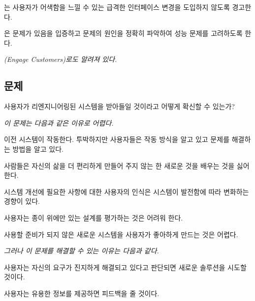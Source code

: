 \documentclass[a4paper,10pt,twoside]{book}
\begin{document}
\begin{bulletlist}
\item  {}는 사용자가 어색함을 느낄 수 있는 급격한 인터페이스 변경을 도입하지 않도록 경고한다.

\item {}은 문제가 있음을 입증하고 문제의 원인을 정확히 파악하여 성능 문제를 고려하도록 한다.
\end{bulletlist}


\emph{(Engage Customers)로도 알려져 있다.} \cite{Copl95d}


\subsection*{문제}

사용자가 리엔지니어링된 시스템을 받아들일 것이라고 어떻게 확신할 수 있는가?

\emph{이 문제는 다음과 같은 이유로 어렵다.}

\begin{bulletlist}
\item 이전 시스템이 작동한다. 투박하지만 사용자들은 작동 방식을 알고 있고 문제를 해결하는 방법을 알고 있다.

\item 사람들은 자신의 삶을 더 편리하게 만들어 주지 않는 한 새로운 것을 배우는 것을 싫어한다.

\item 시스템 개선에 필요한 사항에 대한 사용자의 인식은 시스템이 발전함에 따라 변화하는 경향이 있다.

\item 사용자는 종이 위에만 있는 설계를 평가하는 것은 어려워 한다.

\item 사용할 준비가 되지 않은 새로운 시스템을 사용자가 좋아하게 만드는 것은 어렵다.
\end{bulletlist}

\emph{그러나 이 문제를 해결할 수 있는 이유는 다음과 같다.}

\begin{bulletlist}
\item 사용자는 자신의 요구가 진지하게 해결되고 있다고 판단되면 새로운 솔루션을 시도할 것이다.

\item 사용자는 유용한 정보를 제공하면 피드백을 줄 것이다.
\end{bulletlist}
\end{document}
